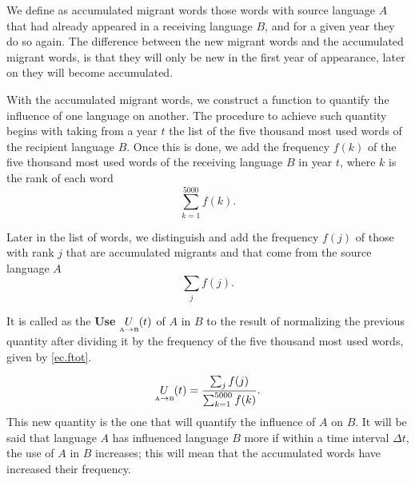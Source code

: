 \documentclass[10pt,letterpaper]{article} %
\begin{document}
We define as accumulated migrant words those words with source language $A$
that had already appeared in a receiving language $B$, and for a given year
they do so again. The difference between the new migrant words and the
accumulated migrant words, is that they will only be new in the first year of
appearance, later on they will become accumulated.

With the accumulated migrant words, we construct a function to quantify the
influence of one language on 
another. The procedure to
achieve such quantity begins with taking from a year $t$ the list of the five
thousand most used words of the recipient language $B$. Once this is done, we
add the frequency $f(k)$ of the five thousand most used words of the receiving
language $B$ in year $t$, where $k$ is the rank of each word
\begin{equation}
\label{ec.ftot}
\sum_{k=1}^{5000} f(k).
\end{equation}

Later in the list of words, we distinguish and add the frequency $f(j)$  of
those with rank $j$ that are accumulated migrants and that come from the source
language $A$ 
\begin{equation}
\label{ec.fpres}
\sum_{j} f(j).
\end{equation}

It is called as the \textbf{Use} $\underset{ \text{\tiny A} \to \text{\tiny B} }{U}(t)$ of $A$ in $B$ to the result of normalizing the previous quantity after dividing it by the frequency of the five thousand most used words, given by \ref{ec.ftot}.

\begin{equation}
\label{ec.fuso1}
\underset{ \text{\tiny A} \to  \text{\tiny B} }{U}(t) = \frac{\sum_{j} f(j)}{\sum_{k=1}^{5000} f(k)}.
\end{equation}
This new quantity is the one that will quantify the influence of $A$ on $B$. It will be said that language $A$ has influenced language $B$ more if within a time interval $\Delta t$, the use of $A$ in $B$ increases; this will mean that the accumulated words have increased their frequency.
\end{document}
